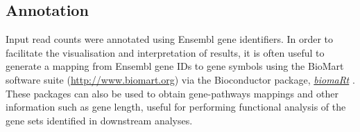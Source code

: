 \documentclass[9pt,a4paper,]{extarticle}
\newenvironment{Shaded}{\begin{snugshade}}{\end{snugshade}}
\newcommand{\CommentTok}[1]{\textcolor[rgb]{0.56,0.35,0.01}{\textit{#1}}}
\newcommand{\ControlFlowTok}[1]{\textcolor[rgb]{0.13,0.29,0.53}{\textbf{#1}}}
\newcommand{\DataTypeTok}[1]{\textcolor[rgb]{0.13,0.29,0.53}{#1}}
\newcommand{\KeywordTok}[1]{\textcolor[rgb]{0.13,0.29,0.53}{\textbf{#1}}}
\newcommand{\NormalTok}[1]{#1}
\newcommand{\OperatorTok}[1]{\textcolor[rgb]{0.81,0.36,0.00}{\textbf{#1}}}
\newcommand{\OtherTok}[1]{\textcolor[rgb]{0.56,0.35,0.01}{#1}}
\newcommand{\StringTok}[1]{\textcolor[rgb]{0.31,0.60,0.02}{#1}}
\begin{document}
\hypertarget{annotation}{%
\subsection{Annotation}\label{annotation}}

Input read counts were annotated using Ensembl gene identifiers.
In order to facilitate the visualisation and interpretation of results, it is
often useful to generate a mapping from Ensembl gene IDs to gene symbols using
the BioMart software suite (\url{http://www.biomart.org})
via the Bioconductor package, \emph{\href{https://bioconductor.org/packages/3.11/biomaRt}{biomaRt}} \citep{Durinck2009}.
These packages can also be used to obtain gene-pathways mappings and other
information such as gene length, useful for performing functional analysis
of the gene sets identified in downstream analyses.

\begin{Shaded}
\end{Shaded}
\end{document}

